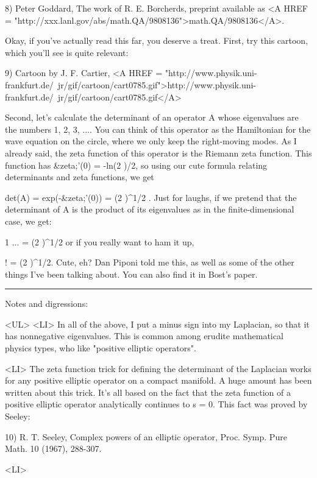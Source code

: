 8) Peter Goddard, The work of R. E. Borcherds, preprint available as
<A HREF = "http://xxx.lanl.gov/abs/math.QA/9808136">math.QA/9808136</A>.

Okay, if you've actually read this far, you deserve a treat.  First, 
try this cartoon, which you'll see is quite relevant:

9) Cartoon by J. F. Cartier, <A HREF = "http://www.physik.uni-frankfurt.de/~jr/gif/cartoon/cart0785.gif">http://www.physik.uni-frankfurt.de/~jr/gif/cartoon/cart0785.gif</A>

Second, let's
calculate the determinant of an operator A whose eigenvalues are the
numbers 1, 2, 3, ....  You can think of this operator as the Hamiltonian
for the wave equation on the circle, where we only keep the right-moving
modes.  As I already said, the zeta function of this operator is the
Riemann zeta function.  This function has &zeta;'(0) = -ln(2 \pi )/2, so
using our cute formula relating determinants and zeta functions, we get

                 det(A) = exp(-&zeta;'(0)) = (2 \pi )^{1/2} . 
Just for laughs, if we pretend that the determinant of A is the product
of its eigenvalues as in the finite-dimensional case, we get:

                    1   \times  ... = (2 \pi )^{1/2} 
or if you really want to ham it up,

                      \infty ! = (2 \pi )^{1/2}.
Cute, eh?  Dan Piponi told me this, as well as some of the other things
I've been talking about.  You can also find it in Bost's paper.  

\par\noindent\rule{\textwidth}{0.4pt}
Notes and digressions:

<UL>
<LI>
In all of the above, I put a minus sign into my Laplacian, so that it
has nonnegative eigenvalues.  This is common among erudite mathematical
physics types, who like "positive elliptic operators".

<LI>
The zeta function trick for defining the determinant of the Laplacian
works for any positive elliptic operator on a compact manifold.  A huge
amount has been written about this trick.  It's all based on the fact
that the zeta function of a positive elliptic operator analytically 
continues to s = 0.  This fact was proved by Seeley:

10) R. T. Seeley, Complex powers of an elliptic operator, Proc. Symp.
Pure Math. 10 (1967), 288-307.

<LI>

